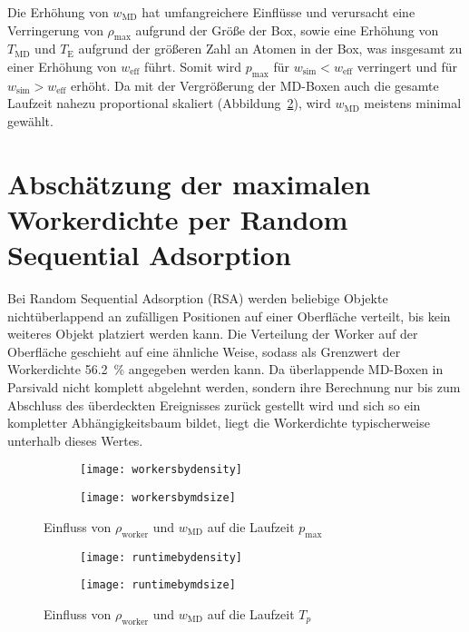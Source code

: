 Die Erhöhung von $w_\text{MD}$ hat umfangreichere Einflüsse und verursacht eine Verringerung von $\rho_\text{max}$ aufgrund der Größe der Box, sowie eine Erhöhung von $T_\text{MD}$ und $T_\text{E}$ aufgrund der größeren Zahl an Atomen in der Box, was insgesamt zu einer Erhöhung von $w_\text{eff}$ führt.
Somit wird $p_\text{max}$ für $w_\text{sim} < w_\text{eff}$ verringert und für $w_\text{sim} > w_\text{eff}$ erhöht.
Da mit der Vergrößerung der MD-Boxen auch die gesamte Laufzeit nahezu proportional skaliert (Abbildung~\ref{fig:tpother}), wird $w_\text{MD}$ meistens minimal gewählt.

\section{Abschätzung der maximalen Workerdichte per Random Sequential Adsorption}
Bei Random Sequential Adsorption (RSA) werden beliebige Objekte nichtüberlappend an zufälligen Positionen auf einer Oberfläche verteilt, bis kein weiteres Objekt platziert werden kann.
Die Verteilung der Worker auf der Oberfläche geschieht auf eine ähnliche Weise, sodass als Grenzwert der Workerdichte \SI{56.2}{\percent}\cite{brosilow_random_1991} angegeben werden kann.
Da überlappende MD-Boxen in Parsivald nicht komplett abgelehnt werden, sondern ihre Berechnung nur bis zum Abschluss des überdeckten Ereignisses zurück gestellt wird und sich so ein kompletter Abhängigkeitsbaum bildet\cite{lorenz_entwicklung_2012}, liegt die Workerdichte typischerweise unterhalb dieses Wertes.

\begin{figure}[p]

  \captionsetup[subfigure]{singlelinecheck=false}
  \def\subfigwidth{7cm}
  \begin{subfigure}[t]{\subfigwidth}
    \texttt{[image: workersbydensity]}
  \end{subfigure}
  \hfill
  \begin{subfigure}[t]{\subfigwidth}
    \texttt{[image: workersbymdsize]}
  \end{subfigure}

  \caption{Einfluss von $\rho_\text{worker}$ und $w_\text{MD}$ auf die Laufzeit $p_\text{max}$}
  \label{fig:pmaxother}

\end{figure}

\begin{figure}[p]

  \captionsetup[subfigure]{singlelinecheck=false}
  \def\subfigwidth{7cm}
  \begin{subfigure}[t]{\subfigwidth}
    \texttt{[image: runtimebydensity]}
  \end{subfigure}
  \hfill
  \begin{subfigure}[t]{\subfigwidth}
    \texttt{[image: runtimebymdsize]}
  \end{subfigure}

  \caption{Einfluss von $\rho_\text{worker}$ und $w_\text{MD}$ auf die Laufzeit $T_p$}
  \label{fig:tpother}

\end{figure}
